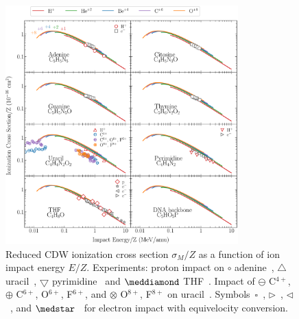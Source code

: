 \documentclass[10pt,showpacs,twocolumn]{revtex4}
\begin{document}
\newpage
\begin{figure}[]
\centering
\includegraphics[width=0.8\textwidth]{figuras/zscale.eps}
\caption{Reduced CDW ionization cross section $\sigma_{M}/Z$ as a function 
of ion impact energy $E/Z$. 
Experiments: 
proton impact on 
\mbox{\Large$\circ$} adenine~\cite{iriki2011},
$\triangle$ uracil~\cite{itoh2013}, 
$\bigtriangledown$ pyrimidine~\cite{wolff2014} and 
$\meddiamond$ THF~\cite{wang2016}.
Impact of $\ominus$ C$^{4+}$, 
$\oplus$ C$^{6+}$, O$^{6+}$, F$^{6+}$, and
$\otimes$ O$^{8+}$, F$^{8+}$ on 
uracil~\cite{agnihotri2012,agnihotri2013}. 
Symbols~$\square$~\cite{rahman2016}, $\rhd$~\cite{bug2017}, 
$\lhd$~\cite{wolf2019}, and $\medstar$~\cite{fuss2009} for electron 
impact with equivelocity conversion.}
\label{fig:zreduced}
\end{figure} 
\end{document}

